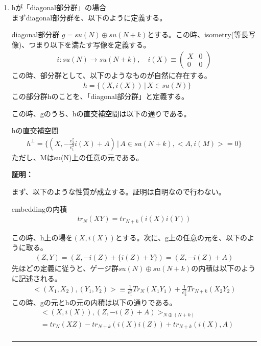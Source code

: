 \documentclass[dvipdfmx,a4paper,10.5pt]{article}
\numberwithin{equation}{section}
\newenvironment{proofbox}
{\begin{prooflabel}\textbf{証明：}\end{prooflabel}\vspace{0.8em}}
{\par\vspace{1em}\hrule\vspace{1em}}
\begin{document}
\begin{enumerate}
\item hが「diagonal部分群」の場合\\
まずdiagonal部分群を、以下のように定義する。
\begin{defbox}{diagonal部分群}
    $g=su(N)\oplus su(N+k)$とする。この時、isometry(等長写像)、つまり以下を満たす写像を定義する。
    \begin{align*}
        i:su(N)\to su(N+k),\quad 
    i(X)\equiv\begin{pmatrix}
        X & 0\\ 0 & 0
    \end{pmatrix}
    \end{align*}
    この時、部分群として、以下のようなものが自然に存在する。
    \begin{align*}
        &h=\{(X,i(X))\,|\,X\in su(N)\}
    \end{align*}
    この部分群hのことを、「diagonal部分群」と定義する。
\end{defbox}
この時、gのうち、hの直交補空間は以下の通りである。
\begin{resultbox}{hの直交補空間}
    \begin{align*}
        h^{\perp}=\{(X,-\frac{e_{2}^{2}}{e_{1}^{2}}i(X)+A)\,|\,A\in su(N+k),<A,i(M)>=0 \}
    \end{align*}
ただし、Mはsu(N)上の任意の元である。
\end{resultbox}
\begin{proofbox}
    まず、以下のような性質が成立する。証明は自明なので行わない。
    \begin{resultbox}{embeddingの内積}
        \begin{align*}
        tr_{N}(XY)=tr_{N+k}(i(X)i(Y))
    \end{align*}
    \end{resultbox}
    この時、h上の場を$(X,i(X))$とする。次に、g上の任意の元を、以下のように取る。
    \begin{align*}
        (Z,Y)=(Z,-i(Z)+\{i(Z)+Y\})=(Z,-i(Z)+A)
    \end{align*}
先ほどの定義に従うと、ゲージ群$su(N)\oplus su(N+k)$の内積は以下のように記述される。
\begin{align*}
    <(X_{1},X_{2}),(Y_{1},Y_{2})>\equiv \frac{1}{e_{1}^{2}}Tr_{N}(X_{1}Y_{1})+\frac{1}{e_{2}^{2}}Tr_{N+k}(X_{2}Y_{2})
\end{align*}
この時、gの元とhの元の内積は以下の通りである。
\begin{align*}
    &<(X,i(X)),(Z,-i(Z)+A)>_{N\oplus (N+k)}\\
    &=tr_{N}(XZ)-tr_{N+k}(i(X)i(Z))+tr_{N+k}(i(X),A)\\

\end{align*}
\end{proofbox}
\end{enumerate}
\end{document}
